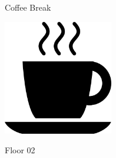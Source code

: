 \documentclass[a4paper]{article}
\begin{document}
\printGenericVSLHeader
\begin{center}
\begin{vsltext}{3cm}{3.2cm}

    Coffee Break

    \vspace{1cm}

    \includegraphics[height=5cm, keepaspectratio=true]{coffeecup.png}

    Floor 02

\end{vsltext}

\end{center}
\end{document}
